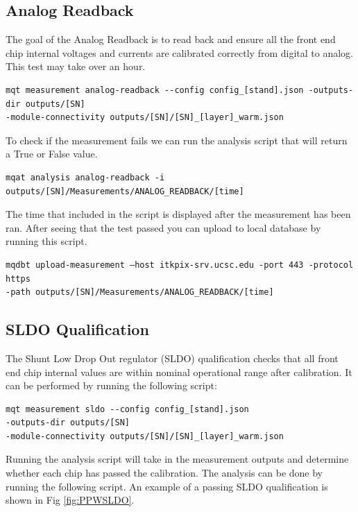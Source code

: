 \documentclass[12pt]{article}
\begin{document}
\subsection{Analog Readback}

The goal of the Analog Readback is to read back and ensure all the front end chip internal voltages and currents are calibrated correctly from digital to analog. This test may take over an hour. 

\begin{verbatim}
mqt measurement analog-readback --config config_[stand].json -outputs-dir outputs/[SN]
-module-connectivity outputs/[SN]/[SN]_[layer]_warm.json
\end{verbatim}

To check if the measurement fails we can run the analysis script that will return a True or False value. 
\begin{verbatim}
mqat analysis analog-readback -i outputs/[SN]/Measurements/ANALOG_READBACK/[time]
\end{verbatim}

The time that included in the script is displayed after the measurement has been ran. After seeing that the test passed you can upload to local database by running this script. 

\begin{verbatim}
mqdbt upload-measurement –host itkpix-srv.ucsc.edu -port 443 -protocol https
-path outputs/[SN]/Measurements/ANALOG_READBACK/[time]
\end{verbatim}

\subsection{SLDO Qualification}


The Shunt Low Drop Out regulator (SLDO) qualification checks that all front end chip internal values are within nominal operational range after calibration. It can be performed by running the following script:

\begin{verbatim}
mqt measurement sldo --config config_[stand].json 
-outputs-dir outputs/[SN]
-module-connectivity outputs/[SN]/[SN]_[layer]_warm.json
\end{verbatim}

Running the analysis script will take in the measurement outputs and determine whether each chip has passed the calibration. The analysis can be done by running the following script. An example of a passing SLDO qualification is shown in Fig \ref{fig:PPWSLDO}. 
\end{document}
